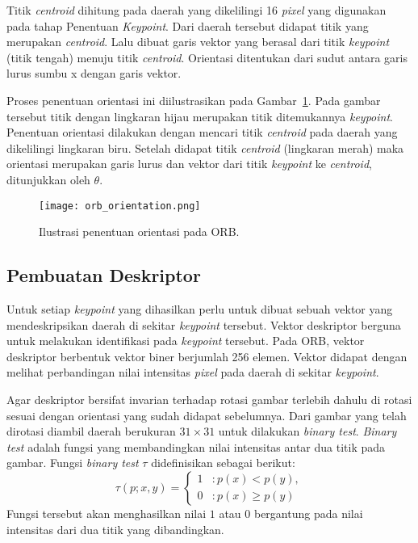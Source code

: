 Titik \textit{centroid} dihitung pada daerah yang dikelilingi 16 \textit{pixel} yang digunakan pada tahap Penentuan \textit{Keypoint}. Dari daerah tersebut didapat titik yang merupakan \textit{centroid}. Lalu dibuat garis vektor yang berasal dari titik \textit{keypoint} (titik tengah) menuju titik \textit{centroid}. Orientasi ditentukan dari sudut antara garis lurus sumbu x dengan garis vektor.

Proses penentuan orientasi ini diilustrasikan pada Gambar~\ref{fig:orb_orientation}. Pada gambar tersebut titik dengan lingkaran hijau merupakan titik ditemukannya \textit{keypoint}. Penentuan orientasi dilakukan dengan mencari titik \textit{centroid} pada daerah yang dikelilingi lingkaran biru. Setelah didapat titik \textit{centroid} (lingkaran merah) maka orientasi merupakan garis lurus dan vektor dari titik \textit{keypoint} ke \textit{centroid}, ditunjukkan oleh $\theta$.
\begin{figure}[H]
	\centering
	\texttt{[image: orb\_orientation.png]}
	\caption{Ilustrasi penentuan orientasi pada ORB.}
	\label{fig:orb_orientation}
\end{figure}

\subsection{Pembuatan Deskriptor}
\label{subsec:orb_deskriptor}
Untuk setiap \textit{keypoint} yang dihasilkan perlu untuk dibuat sebuah vektor yang mendeskripsikan daerah di sekitar \textit{keypoint} tersebut. Vektor deskriptor berguna untuk melakukan identifikasi pada \textit{keypoint} tersebut. Pada ORB, vektor deskriptor berbentuk vektor biner berjumlah 256 elemen. Vektor didapat dengan melihat perbandingan nilai intensitas \textit{pixel} pada daerah di sekitar \textit{keypoint}.

Agar deskriptor bersifat invarian terhadap rotasi gambar terlebih dahulu di rotasi sesuai dengan orientasi yang sudah didapat sebelumnya. Dari gambar yang telah dirotasi diambil daerah berukuran $31\times31$ untuk dilakukan \textit{binary test}. \textit{Binary test} adalah fungsi yang membandingkan nilai intensitas antar dua titik pada gambar. Fungsi \textit{binary test} $\tau$ didefinisikan sebagai berikut:
\begin{equation}
	\tau(p;x,y)=\begin{cases}
		1 & :p(x) < p(y), \\
		0 & :p(x) \geq p(y)
	\end{cases}
\end{equation}
Fungsi tersebut akan menghasilkan nilai $1$ atau $0$ bergantung pada nilai intensitas dari dua titik yang dibandingkan.

